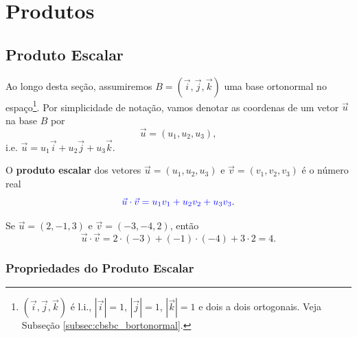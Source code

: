 
\chapter{Produtos}\label{cap_produtos}
\badgeRevisar

\section{Produto Escalar}\label{cap_produtos_sec_prodesc}
\badgeRevisar

Ao longo desta seção, assumiremos $B = (\vec{i},\vec{j},\vec{k})$ uma base ortonormal no espaço\footnote{$(\vec{i},\vec{j},\vec{k})$ é l.i., $|\vec{i}|=1$, $|\vec{j}|=1$, $|\vec{k}|=1$ e dois a dois ortogonais. Veja Subseção \ref{subsec:cbsbc_bortonormal}.}. Por simplicidade de notação, vamos denotar as coordenas de um vetor $\vec{u}$ na base $B$ por
\begin{equation}
  \vec{u} = (u_1, u_2, u_3),
\end{equation}
i.e. $\vec{u} = u_1\vec{i} + u_2\vec{j} + u_3\vec{k}$.

O {\color{blue}\bf produto escalar} dos vetores $\vec{u} = (u_1,u_2,u_3)$ e $\vec{v}=(v_1,v_2,v_3)$ é o número real
\begin{equation}\label{eq:prodesc_ortonormal}
  {\color{blue}\vec{u}\cdot\vec{v} = u_1v_1+u_2v_2+u_3v_3}.
\end{equation}

\begin{ex}
  Se $\vec{u}=(2,-1,3)$ e $\vec{v}=(-3,-4,2)$, então
  \begin{equation}
    \vec{u}\cdot\vec{v} = 2\cdot(-3)+(-1)\cdot(-4)+3\cdot 2 = 4.
  \end{equation}
\end{ex}

\subsection{Propriedades do Produto Escalar}

